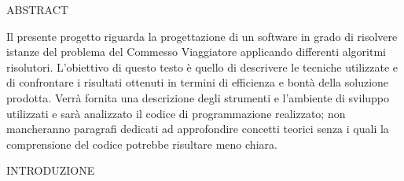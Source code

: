 \documentclass[11pt]{article}
\begin{document}
ABSTRACT

\vspace{2\baselineskip}

Il presente progetto riguarda la progettazione di un software in grado di risolvere istanze del problema del Commesso Viaggiatore applicando differenti algoritmi risolutori. L'obiettivo di questo testo è quello di descrivere le tecniche utilizzate e di confrontare i risultati ottenuti in termini di efficienza e bontà della soluzione prodotta. Verrà fornita una descrizione degli strumenti e l'ambiente di sviluppo utilizzati e sarà analizzato il codice di programmazione realizzato; non mancheranno paragrafi dedicati ad approfondire concetti teorici senza i quali la comprensione del codice potrebbe risultare meno chiara. 

\vspace{2\baselineskip}
INTRODUZIONE 

\vspace{2\baselineskip}
\end{document}

